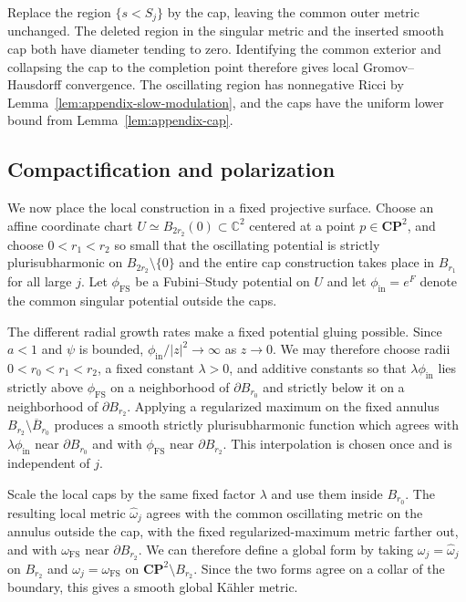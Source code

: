 \documentclass[11pt]{amsart}
\theoremstyle{definition}
\theoremstyle{remark}
\begin{document}
Replace the region $\{s<S_j\}$ by the cap, leaving the common outer metric unchanged.  The deleted region in the singular metric and the inserted smooth cap both have diameter tending to zero.  Identifying the common exterior and collapsing the cap to the completion point therefore gives local Gromov--Hausdorff convergence.  The oscillating region has nonnegative Ricci by Lemma~\ref{lem:appendix-slow-modulation}, and the caps have the uniform lower bound from Lemma~\ref{lem:appendix-cap}.

\subsection{Compactification and polarization}
\label{subsec:appendix-compactification}

We now place the local construction in a fixed projective surface.  Choose an affine coordinate chart $U\simeq B_{2r_2}(0)\subset\mathbb C^2$ centered at a point $p\in\mathbf{CP}^2$, and choose $0<r_1<r_2$ so small that the oscillating potential is strictly plurisubharmonic on $B_{2r_2}\setminus\{0\}$ and the entire cap construction takes place in $B_{r_1}$ for all large $j$.  Let $\phi_{\mathrm{FS}}$ be a Fubini--Study potential on $U$ and let $\phi_{\mathrm{in}}=e^F$ denote the common singular potential outside the caps.

The different radial growth rates make a fixed potential gluing possible.  Since $a<1$ and $\psi$ is bounded, $\phi_{\mathrm{in}}/|z|^2\to\infty$ as $z\to0$.  We may therefore choose radii $0<r_0<r_1<r_2$, a fixed constant $\lambda>0$, and additive constants so that $\lambda\phi_{\mathrm{in}}$ lies strictly above $\phi_{\mathrm{FS}}$ on a neighborhood of $\partial B_{r_0}$ and strictly below it on a neighborhood of $\partial B_{r_2}$.  Applying a regularized maximum on the fixed annulus $B_{r_2}\setminus\overline{B}_{r_0}$ produces a smooth strictly plurisubharmonic function which agrees with $\lambda\phi_{\mathrm{in}}$ near $\partial B_{r_0}$ and with $\phi_{\mathrm{FS}}$ near $\partial B_{r_2}$.  This interpolation is chosen once and is independent of $j$.

Scale the local caps by the same fixed factor $\lambda$ and use them inside $B_{r_0}$.  The resulting local metric $\widehat\omega_j$ agrees with the common oscillating metric on the annulus outside the cap, with the fixed regularized-maximum metric farther out, and with $\omega_{\mathrm{FS}}$ near $\partial B_{r_2}$.  We can therefore define a global form by taking $\omega_j=\widehat\omega_j$ on $B_{r_2}$ and $\omega_j=\omega_{\mathrm{FS}}$ on $\mathbf{CP}^2\setminus B_{r_2}$.  Since the two forms agree on a collar of the boundary, this gives a smooth global K\"ahler metric.
\end{document}

